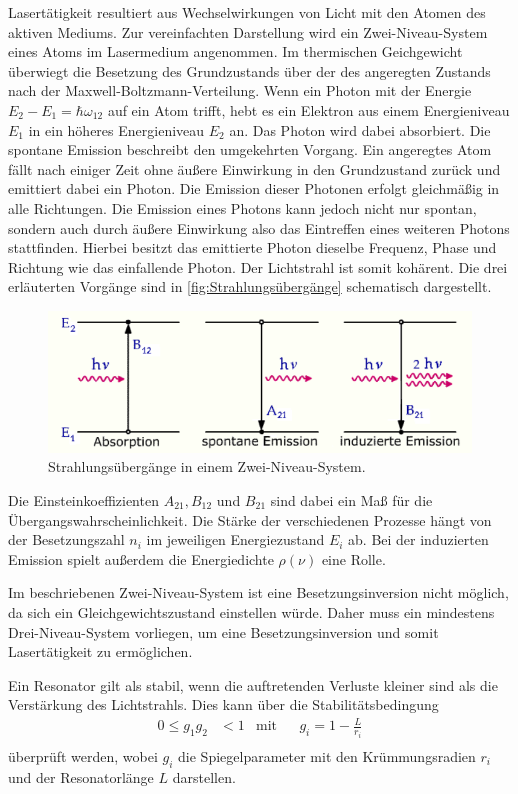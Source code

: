 Lasertätigkeit resultiert aus Wechselwirkungen von Licht mit den Atomen des aktiven Mediums.
Zur vereinfachten Darstellung wird ein Zwei-Niveau-System eines Atoms im Lasermedium angenommen.
Im thermischen Geichgewicht überwiegt die Besetzung des Grundzustands über der des angeregten Zustands nach der Maxwell-Boltzmann-Verteilung.
Wenn ein Photon mit der Energie $E_2-E_1 =\hbar \omega_{12}$ auf ein Atom trifft, hebt es ein Elektron aus einem Energieniveau $E_1$ in ein höheres
Energieniveau $E_2$ an. Das Photon wird dabei absorbiert.
Die spontane Emission beschreibt den umgekehrten Vorgang. Ein angeregtes Atom fällt nach einiger Zeit ohne äußere Einwirkung in den Grundzustand zurück
und emittiert dabei ein Photon. Die Emission dieser Photonen erfolgt gleichmäßig in alle Richtungen.
Die Emission eines Photons kann jedoch nicht nur spontan, sondern auch durch äußere Einwirkung also das Eintreffen eines weiteren Photons
stattfinden. Hierbei besitzt das emittierte Photon dieselbe Frequenz, Phase und Richtung wie das einfallende Photon.
Der Lichtstrahl ist somit kohärent.
Die drei erläuterten Vorgänge sind in \autoref{fig:Strahlungsübergänge} schematisch dargestellt.\\

\begin{figure}[H]
    \centering
    \includegraphics[scale=0.7]{Abbildungen/Prozesse.png}
    \caption{Strahlungsübergänge in einem Zwei-Niveau-System.\cite{prozess}}
    \label{fig:Strahlungsübergänge}
\end{figure}
Die Einsteinkoeffizienten $A_{21}, B_{12}$ und $B_{21}$ sind dabei ein Maß für die Übergangswahrscheinlichkeit.
Die Stärke der verschiedenen Prozesse hängt von der Besetzungszahl $n_i$ im jeweiligen Energiezustand $E_i$ ab.
Bei der induzierten Emission spielt außerdem die Energiedichte $\rho(\nu)$ eine Rolle.

Im beschriebenen Zwei-Niveau-System ist eine Besetzungsinversion nicht möglich, da sich ein Gleichgewichtszustand einstellen würde.
Daher muss ein mindestens Drei-Niveau-System vorliegen, um eine Besetzungsinversion und somit Lasertätigkeit zu ermöglichen.

Ein Resonator gilt als stabil, wenn die auftretenden Verluste kleiner sind als die Verstärkung des Lichtstrahls.
Dies kann über die Stabilitätsbedingung
\begin{align}
    0 \leq g_1 g_2 &< 1 & \text{mit}& & g_i = 1 - \frac{L}{r_i}\\
    \label{eqn:Stabilitätsbedingung}
\end{align}
überprüft werden, wobei $g_i$ die Spiegelparameter mit den Krümmungsradien $r_i$ und der Resonatorlänge $L$ darstellen.





